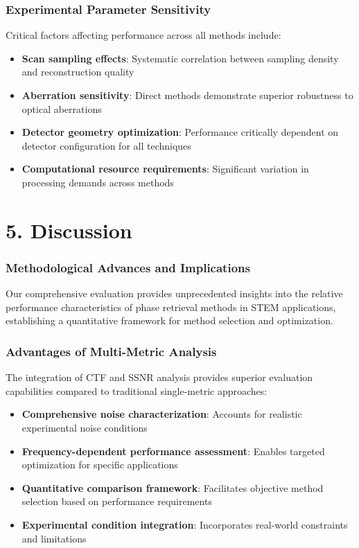 \documentclass[
  letterpaper,
]{book}
\providecommand{\tightlist}{%
  \setlength{\itemsep}{0pt}\setlength{\parskip}{0pt}}
\begin{document}
\subsection{Experimental Parameter
Sensitivity}\label{experimental-parameter-sensitivity}

Critical factors affecting performance across all methods include:

\begin{itemize}
\tightlist
\item
  \textbf{Scan sampling effects}: Systematic correlation between
  sampling density and reconstruction quality
\item
  \textbf{Aberration sensitivity}: Direct methods demonstrate superior
  robustness to optical aberrations
\item
  \textbf{Detector geometry optimization}: Performance critically
  dependent on detector configuration for all techniques
\item
  \textbf{Computational resource requirements}: Significant variation in
  processing demands across methods
\end{itemize}


\chapter{5. Discussion}\label{discussion-1}

\subsection{Methodological Advances and
Implications}\label{methodological-advances-and-implications}

Our comprehensive evaluation provides unprecedented insights into the
relative performance characteristics of phase retrieval methods in STEM
applications, establishing a quantitative framework for method selection
and optimization.

\subsection{Advantages of Multi-Metric
Analysis}\label{advantages-of-multi-metric-analysis}

The integration of CTF and SSNR analysis provides superior evaluation
capabilities compared to traditional single-metric approaches:

\begin{itemize}
\tightlist
\item
  \textbf{Comprehensive noise characterization}: Accounts for realistic
  experimental noise conditions
\item
  \textbf{Frequency-dependent performance assessment}: Enables targeted
  optimization for specific applications\\
\item
  \textbf{Quantitative comparison framework}: Facilitates objective
  method selection based on performance requirements
\item
  \textbf{Experimental condition integration}: Incorporates real-world
  constraints and limitations
\end{itemize}
\end{document}
